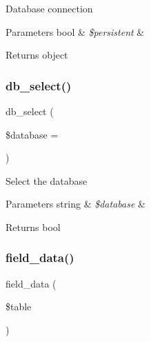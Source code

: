 Database connection


\begin{DoxyParams}[1]{Parameters}
bool & {\em \$persistent} & \\
\hline
\end{DoxyParams}
\begin{DoxyReturn}{Returns}
object 
\end{DoxyReturn}
\mbox{\label{class_c_i___d_b__pdo__mysql__driver_a18ae9c21870b30b45337c5e3626190cc}} 
\subsubsection{\texorpdfstring{db\+\_\+select()}{db\_select()}}
{\footnotesize\ttfamily db\+\_\+select (\begin{DoxyParamCaption}\item[{}]{\$database = {\ttfamily \textquotesingle{}\textquotesingle{}} }\end{DoxyParamCaption})}

Select the database


\begin{DoxyParams}[1]{Parameters}
string & {\em \$database} & \\
\hline
\end{DoxyParams}
\begin{DoxyReturn}{Returns}
bool 
\end{DoxyReturn}
\mbox{\label{class_c_i___d_b__pdo__mysql__driver_a90355121e1ed009e0efdbd544ab56efa}} 
\subsubsection{\texorpdfstring{field\+\_\+data()}{field\_data()}}
{\footnotesize\ttfamily field\+\_\+data (\begin{DoxyParamCaption}\item[{}]{\$table }\end{DoxyParamCaption})}

